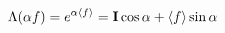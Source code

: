 \begin{equation}\label{Lamaf}
\Lambda(\alpha f)=e^{\alpha \left<f\right>}={\bf I}\cos\alpha+ 
\left<f\right>\sin\alpha  
\end{equation} 
